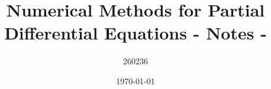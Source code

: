 \author{260236}
\title{Numerical Methods for Partial Differential Equations - Notes - \version}
\date{\printdayoff\today}
\maketitle